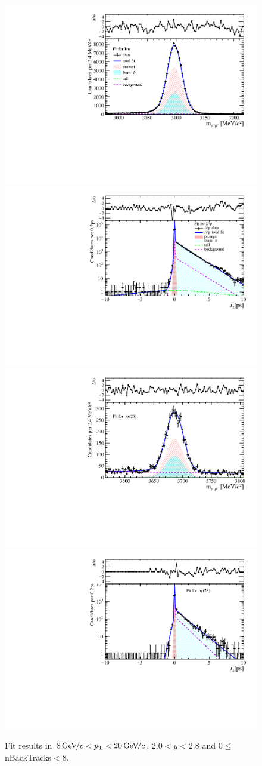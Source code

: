 \begin{figure}[H]
\begin{center}
\includegraphics[width=0.47\linewidth]{pdf/Jpsi/drawmassB/n1y1pt5.pdf}
\includegraphics[width=0.47\linewidth]{pdf/Jpsi/2DFitB/n1y1pt5.pdf}
\vspace*{-0.5cm}
\includegraphics[width=0.47\linewidth]{pdf/Psi2S/drawmassB/n1y1pt5.pdf}
\includegraphics[width=0.47\linewidth]{pdf/Psi2S/2DFitB/n1y1pt5.pdf}
\vspace*{-0.5cm}
\end{center}
\caption{Fit results in $8\text{\,Ge\kern -0.1em V\!/}c<p_{\mathrm{T}}<20\text{\,Ge\kern -0.1em V\!/}c$, $2.0<y<2.8$ and 0$\leq$nBackTracks$<$8.}
\label{Fitn1y1pt5}
\end{figure}

